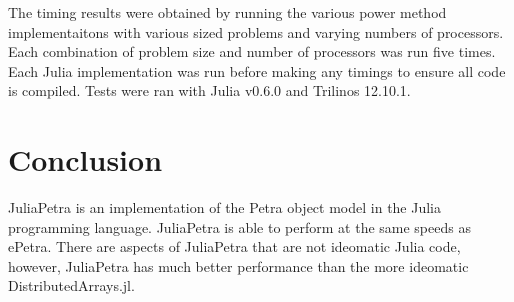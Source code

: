 \documentclass[acmsmall]{acmart}
\begin{document}
The timing results were obtained by running the various power method implementaitons
with various sized problems and varying numbers of processors.
Each combination of problem size and number of processors was run five times.
Each Julia implementation was run before making any timings to ensure all code is
compiled.
Tests were ran with Julia v0.6.0 and Trilinos 12.10.1.


\section{Conclusion}

JuliaPetra is an implementation of the Petra object model in the Julia programming language.
JuliaPetra is able to perform at the same speeds as ePetra.
There are aspects of JuliaPetra that are not ideomatic Julia code, however, JuliaPetra has much
better performance than the more ideomatic DistributedArrays.jl.



\end{document}

